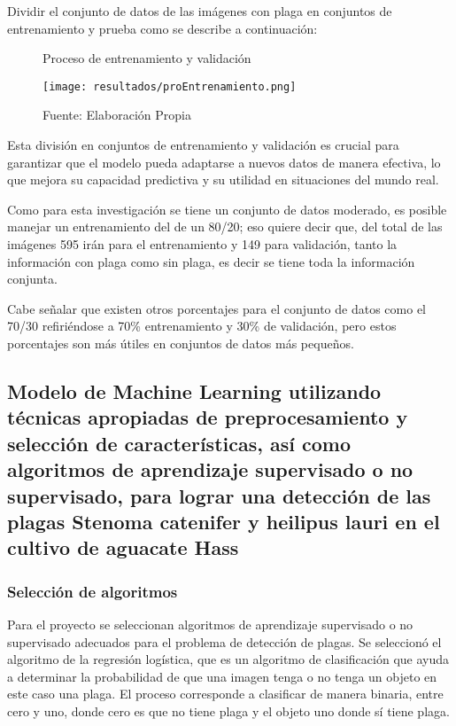 Dividir el conjunto de datos de las imágenes con plaga en conjuntos de entrenamiento y prueba como se describe a continuación:

\begin{figure}[h]
\centering
\caption{Proceso de entrenamiento y validación}
\texttt{[image: resultados/proEntrenamiento.png]}
\caption*{\footnotesize Fuente: Elaboración Propia}
\label{fig:figuraProEntrenamiento}
\end{figure}

Esta división en conjuntos de entrenamiento y validación es crucial para garantizar que el modelo pueda adaptarse a nuevos datos de manera efectiva, lo que mejora su capacidad predictiva y su utilidad en situaciones del mundo real.

Como para esta investigación se tiene un conjunto de datos moderado, es posible manejar un entrenamiento del de un 80/20; eso quiere decir que, del total de las imágenes 595 irán para el entrenamiento y 149 para validación, tanto la información con plaga como sin plaga, es decir se tiene toda la información conjunta.

Cabe señalar que existen otros porcentajes para el conjunto de datos como el 70/30 refiriéndose a 70\% entrenamiento y 30\% de validación, pero estos porcentajes son más útiles en conjuntos de datos más pequeños.

\subsection{Modelo de Machine Learning utilizando técnicas apropiadas de preprocesamiento y selección de características, así como algoritmos de aprendizaje supervisado o no supervisado, para lograr una detección de las plagas Stenoma catenifer y heilipus lauri en el cultivo de aguacate Hass}

\newpage

\subsubsection{Selección de algoritmos}

Para el proyecto se seleccionan algoritmos de aprendizaje supervisado o no supervisado adecuados para el problema de detección de plagas. Se seleccionó el algoritmo de la regresión logística, que es un algoritmo de clasificación que ayuda a determinar la probabilidad de que una imagen tenga o no tenga un objeto en este caso una plaga. El proceso corresponde a clasificar de manera binaria, entre cero y uno, donde cero es que no tiene plaga y el objeto uno donde sí tiene plaga.


